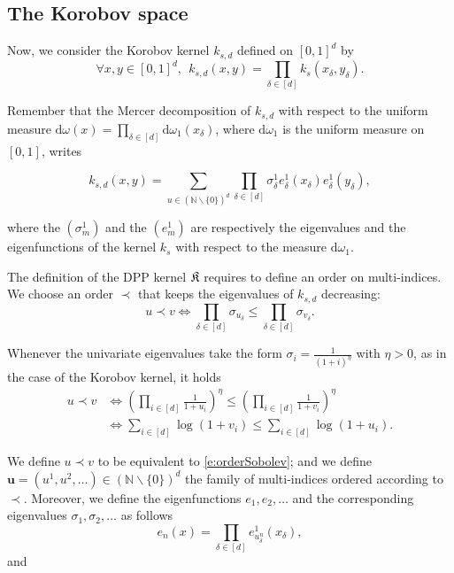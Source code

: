 \documentclass[twoside,11pt]{book}
\numberwithin{theorem}{chapter}
\numberwithin{definition}{chapter}
\numberwithin{proposition}{chapter}
\numberwithin{corollary}{chapter}
\numberwithin{example}{chapter}
\numberwithin{lemma}{chapter}
\begin{document}
\subsection{The Korobov space}
Now, we consider the Korobov kernel $k_{s,d}$ defined on $[0,1]^{d}$ by
\begin{equation}
\forall x, y \in [0,1]^{d}, \:\:k_{s,d}(x,y) = \prod\limits_{\delta \in [d]} k_{s}(x_{\delta},y_{\delta}).
\end{equation}

Remember that the Mercer decomposition of $k_{s,d}$ with respect to the uniform measure $\mathrm{d}\omega(x) = \prod\limits_{\delta \in [d]} \mathrm{d}\omega_{1}(x_{\delta})$, where $\mathrm{d}\omega_{1}$ is the uniform measure on $[0,1]$, writes

\begin{equation}
k_{s,d}(x,y) = \sum\limits_{u \in (\mathbb{N}\smallsetminus \{0\})^{d}} \prod\limits_{\delta \in [d]} \sigma_{\delta}^{1} e_{\delta}^{1}(x_{\delta}) e_{\delta}^{1}(y_{\delta}),
\end{equation}

where the $(\sigma_{m}^{1})$ and the $(e_{m}^{1})$ are respectively the eigenvalues and the eigenfunctions of the kernel $k_{s}$ with respect to the measure $\mathrm{d}\omega_{1}$.


The definition of the DPP kernel $\frak K$ requires to define an order on multi-indices. We choose an order $\prec$ that keeps the eigenvalues of $k_{s,d}$ decreasing:
\begin{equation}
u \prec v \iff  \prod\limits_{\delta \in [d]} \sigma_{u_{\delta}} \leq \prod\limits_{\delta \in [d]} \sigma_{v_{\delta}}.
\end{equation}


 Whenever the univariate eigenvalues take the form $\sigma_{i} = \frac{1}{(1+i)^{\eta}}$ with $\eta >0$, as in the case of the Korobov kernel, it holds
\begin{align}
u \prec v  & \Leftrightarrow \left(\prod\limits_{i \in [d]} \frac{1}{1+u_{i}} \right)^{\eta} \leq \left(\prod\limits_{i \in [d]} \frac{1}{1+v_{i}} \right)^{\eta} \\
& \Leftrightarrow \sum\limits_{i \in [d]} \log(1+v_{i})  \leq \sum\limits_{i \in [d]} \log(1+u_{i}) .
\label{e:orderSobolev}
\end{align}

We define $u \prec v$ to be equivalent to \eqref{e:orderSobolev}; and we define $\textbf{u}= (u^{1}, u^{2},\dots)\in (\mathbb{N} \smallsetminus \{0\})^d$ the family of multi-indices ordered according to $\prec$. Moreover, we define the eigenfunctions $e_{1}, e_{2}, \dots$ and the corresponding eigenvalues $\sigma_{1}, \sigma_{2}, \dots$ as follows
\begin{equation}
e_{n}(x) = \prod\limits_{\delta \in [d]} e_{u_{\delta}^{n}}^{1}(x_{\delta}),
\end{equation}
and 
\end{document}
